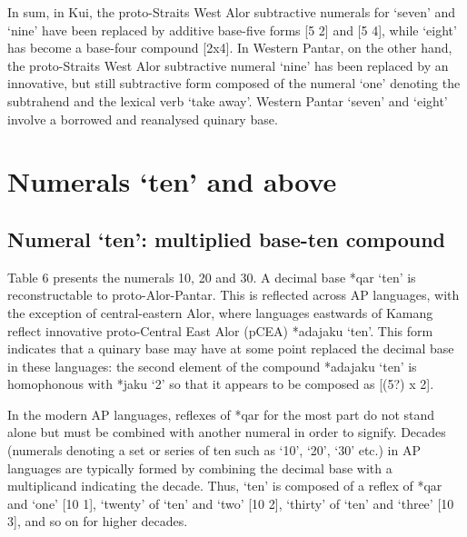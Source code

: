 {In sum, in Kui, the proto-Straits West Alor subtractive numerals for `seven' and `nine' have been replaced by additive base-five forms [5 2] and [5 4], while `eight' has become a base-four compound [2x4]. In Western Pantar, on the other hand, the proto-Straits West Alor subtractive numeral `nine' has been replaced by an innovative, but still subtractive form composed of the numeral `one' denoting the subtrahend and the lexical verb `take away'. Western Pantar `seven' and `eight' involve a borrowed and reanalysed quinary base.


\section{Numerals `ten' and above}
\subsection{Numeral `ten': multiplied base-ten compound}
Table 6 presents the numerals 10, 20 and 30. A decimal base *qar `ten' is reconstructable to proto-Alor-Pantar. This is reflected across AP languages, with the exception of central-eastern Alor, where languages eastwards of Kamang reflect innovative proto-Central East Alor (pCEA) *adajaku `ten'. This form indicates that a quinary base may have at some point replaced the decimal base in these languages: the second element of the compound *adajaku `ten' is homophonous with *jaku `2' so that it appears to be composed as [(5?) x 2].

In the modern AP languages, reflexes of *qar for the most part do not stand alone but must be combined with another numeral in order to signify. Decades (numerals denoting a set or series of ten such as `10', `20', `30' etc.) in AP languages are typically formed by combining the decimal base with a multiplicand indicating the decade. Thus, `ten' is composed of a reflex of *qar and `one' [10 1], `twenty' of `ten' and `two' [10 2], `thirty' of `ten' and `three' [10 3], and so on for higher decades.




\begin{table}



\end{table}}
